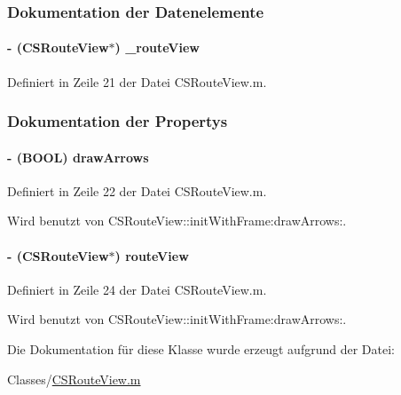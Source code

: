 \subsubsection{Dokumentation der Datenelemente}
\hypertarget{interface_c_s_route_view_internal_a12be00963b31debb7c845f9197549adc}{
\paragraph[{\_\-routeView}]{\setlength{\rightskip}{0pt plus 5cm}-\/ ({\bf CSRouteView}$\ast$) {\bf \_\-routeView}}\hfill}
\label{interface_c_s_route_view_internal_a12be00963b31debb7c845f9197549adc}


Definiert in Zeile 21 der Datei CSRouteView.m.

\subsubsection{Dokumentation der Propertys}
\hypertarget{interface_c_s_route_view_internal_af74604d36a54617c902613161e126e0c}{
\paragraph[{drawArrows}]{\setlength{\rightskip}{0pt plus 5cm}-\/ (BOOL) drawArrows}\hfill}
\label{interface_c_s_route_view_internal_af74604d36a54617c902613161e126e0c}


Definiert in Zeile 22 der Datei CSRouteView.m.

Wird benutzt von CSRouteView::initWithFrame:drawArrows:.\hypertarget{interface_c_s_route_view_internal_afdd115549c3d417e7fa33e60c7f14132}{
\paragraph[{routeView}]{\setlength{\rightskip}{0pt plus 5cm}-\/ ({\bf CSRouteView}$\ast$) routeView}\hfill}
\label{interface_c_s_route_view_internal_afdd115549c3d417e7fa33e60c7f14132}


Definiert in Zeile 24 der Datei CSRouteView.m.

Wird benutzt von CSRouteView::initWithFrame:drawArrows:.

Die Dokumentation für diese Klasse wurde erzeugt aufgrund der Datei:\begin{DoxyCompactItemize}
\item 
Classes/\hyperlink{_c_s_route_view_8m}{CSRouteView.m}\end{DoxyCompactItemize}
